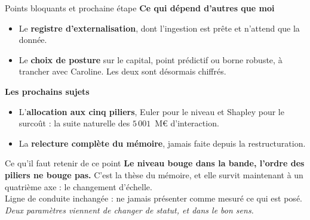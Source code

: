 \documentclass[11pt]{beamer}
\begin{document}
\begin{frame}{Points bloquants et prochaine étape}
\small
\textbf{Ce qui dépend d'autres que moi}
\begin{itemize}\itemsep0pt
\item Le \textbf{registre d'externalisation}, dont l'ingestion est prête et n'attend que la
      donnée.
\item Le \textbf{choix de posture} sur le capital, point prédictif ou borne robuste, à
      trancher avec Caroline. Les deux sont désormais chiffrés.
\end{itemize}
\textbf{Les prochains sujets}
\begin{itemize}\itemsep0pt
\item L'\textbf{allocation aux cinq piliers}, Euler pour le niveau et Shapley pour le
      surcoût : la suite naturelle des $5\,001$~M\euro{} d'interaction.
\item La \textbf{relecture complète du mémoire}, jamais faite depuis la restructuration.
\end{itemize}
\begin{block}{Ce qu'il faut retenir de ce point}
\textbf{Le niveau bouge dans la bande, l'ordre des piliers ne bouge pas.} C'est la thèse du
mémoire, et elle survit maintenant à un quatrième axe : le changement d'échelle.\\[3pt]
Ligne de conduite inchangée : ne jamais présenter comme mesuré ce qui est posé.
\emph{Deux paramètres viennent de changer de statut, et dans le bon sens.}
\end{block}
\end{frame}
\end{document}
